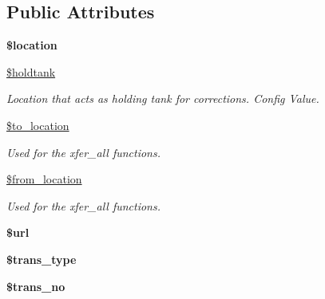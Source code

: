 \subsection*{Public Attributes}
\begin{DoxyCompactItemize}
\item 
\hypertarget{class_inventory_aa787e03e29020e679e25b6504711f908}{}\label{class_inventory_aa787e03e29020e679e25b6504711f908} 
{\bfseries \$location}
\item 
\hypertarget{class_inventory_aecb8d5b7cc910234b879b6d014e887ed}{}\label{class_inventory_aecb8d5b7cc910234b879b6d014e887ed} 
\hyperlink{class_inventory_aecb8d5b7cc910234b879b6d014e887ed}{\$holdtank}
\begin{DoxyCompactList}\small\item\em Location that acts as holding tank for corrections. Config Value. \end{DoxyCompactList}\item 
\hypertarget{class_inventory_ae8dc058519cb65b6f98c5b861e9b4b6c}{}\label{class_inventory_ae8dc058519cb65b6f98c5b861e9b4b6c} 
\hyperlink{class_inventory_ae8dc058519cb65b6f98c5b861e9b4b6c}{\$to\+\_\+location}
\begin{DoxyCompactList}\small\item\em Used for the xfer\+\_\+all functions. \end{DoxyCompactList}\item 
\hypertarget{class_inventory_add61c6c29ac22e95ff7393f247b4cf24}{}\label{class_inventory_add61c6c29ac22e95ff7393f247b4cf24} 
\hyperlink{class_inventory_add61c6c29ac22e95ff7393f247b4cf24}{\$from\+\_\+location}
\begin{DoxyCompactList}\small\item\em Used for the xfer\+\_\+all functions. \end{DoxyCompactList}\item 
\hypertarget{class_inventory_a23522a816fa22f04ddbe1bb7fe55db56}{}\label{class_inventory_a23522a816fa22f04ddbe1bb7fe55db56} 
{\bfseries \$url}
\item 
\hypertarget{class_inventory_a09b60b4e48ba34b348a644aad86bc914}{}\label{class_inventory_a09b60b4e48ba34b348a644aad86bc914} 
{\bfseries \$trans\+\_\+type}
\item 
\hypertarget{class_inventory_a6c461cfddac57ddd5f56f394cee33328}{}\label{class_inventory_a6c461cfddac57ddd5f56f394cee33328} 
{\bfseries \$trans\+\_\+no}
\item 
\hypertarget{class_inventory_a4b9f25d8866f4f876d1646b1a5f693df}{}\label{class_inventory_a4b9f25d8866f4f876d1646b1a5f693df} 

\end{DoxyCompactItemize}
